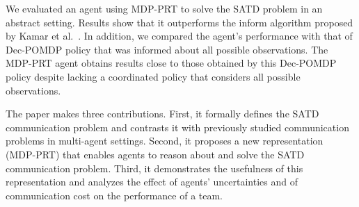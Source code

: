We evaluated an agent using MDP-PRT to solve the SATD problem in an abstract setting. Results show that it outperforms the inform algorithm proposed by Kamar et al.~. In addition, we compared the agent's performance with that of 
Dec-POMDP policy that was informed about all possible observations.
The MDP-PRT agent obtains results close to those obtained by this Dec-POMDP policy despite lacking a  coordinated policy that considers all possible observations.


The paper makes three contributions. First, it formally defines  the SATD communication problem
 and contrasts it with previously studied communication problems in multi-agent settings. Second, it proposes a new representation (MDP-PRT)  that enables agents to reason about and solve the SATD communication problem. Third, it demonstrates the usefulness of this representation and analyzes the effect of agents' uncertainties and of communication cost on the performance of a team.


